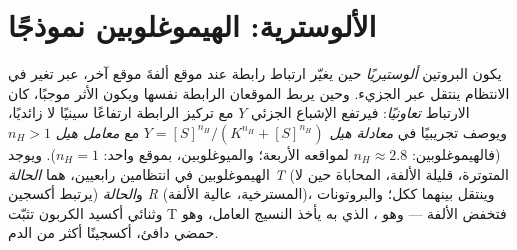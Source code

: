 \section{الألوسترية: الهيموغلوبين نموذجًا}

\begin{definition}\label{def:b3:structural-biology:allostery}
يكون البروتين \emph{ألوستيريًا} حين يغيّر ارتباط رابطة عند
موقع ألفةَ موقع آخر، عبر تغير في
الانتظام ينتقل عبر الجزيء. وحين يربط الموقعان
الرابطة نفسها ويكون الأثر موجبًا، كان الارتباط
\emph{تعاونيًا}: فيرتفع الإشباع الجزئي $Y$ مع تركيز
الرابطة ارتفاعًا سينيًا لا زائديًا، ويوصف
تجريبيًا في \emph{معادلة هيل} $Y = [S]^{n_{H}}/(K^{n_{H}} +
[S]^{n_{H}})$ مع \emph{معامل هيل} $n_{H} > 1$ (فالهيموغلوبين:
$n_{H} \approx 2.8$ لمواقعه الأربعة؛ والميوغلوبين، بموقع واحد: $n_{H} =
1$). ويوجد الهيموغلوبين في انتظامين رابعيين، هما
\emph{الحالة T} (المتوترة، قليلة الألفة، المحاباة حين لا يرتبط أكسجين)
و\emph{الحالة R} (المسترخية، عالية الألفة)، وينتقل بينهما
ككل؛ والبروتونات وثنائي أكسيد الكربون 
تثبّت T فتخفض الألفة --- وهو ، الذي به يأخذ
النسيج العامل، وهو حمضي دافئ، أكسجينًا أكثر من الدم.
\end{definition}

